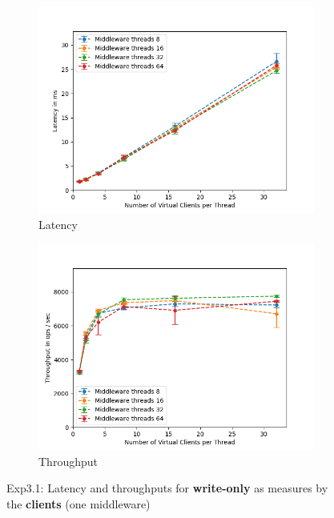 \documentclass[11pt,a4paper]{article}
\begin{document}
\begin{figure}[H]
\centering
\begin{subfigure}{.5\textwidth}
    \centering
    \includegraphics[width=\textwidth]{img/exp3_1/exp3_1__latency_client_write_1.png}
    \caption{Latency}
    \label{fig:mesh1}
\end{subfigure}%
\begin{subfigure}{.5\textwidth}
      \centering
    \includegraphics[width=\textwidth]{img/exp3_1/exp3_1__throughput_client_write_1.png}
    \caption{Throughput}
    \label{fig:mesh1}
\end{subfigure}
\caption{Exp3.1: Latency and throughputs for \textbf{write-only} as measures by the \textbf{clients} (one middleware)}
\label{fig:test}
\end{figure}
\end{document}
